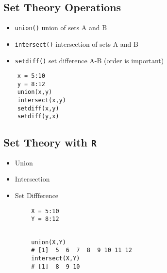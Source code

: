 \documentclass[a4paper,12pt]{article}
\begin{document}
\subsection{Set Theory Operations}
\begin{itemize}
	\item \texttt{union()} union of sets A and B
	\item \texttt{intersect()} intersection of sets A and B
	\item \texttt{setdiff()} set difference A-B (order is important)
\end{itemize}

\begin{framed}
	\begin{verbatim}
	x = 5:10
	y = 8:12
	union(x,y)
	intersect(x,y)
	setdiff(x,y)
	setdiff(y,x)
	\end{verbatim}
\end{framed}




\subsection{Set Theory with \texttt{R} }
	
	\begin{itemize}
		\item Union
		\item Intersection
		\item Set Diffference
	\end{itemize}
	\begin{framed}
		\begin{verbatim}
		X = 5:10
		Y = 8:12
		\end{verbatim}
	\end{framed}

	\begin{framed}
		\begin{verbatim}
		
		union(X,Y)
		# [1]  5  6  7  8  9 10 11 12
		intersect(X,Y)
		# [1]  8  9 10
		
		\end{verbatim}
	\end{framed}
\end{document}
